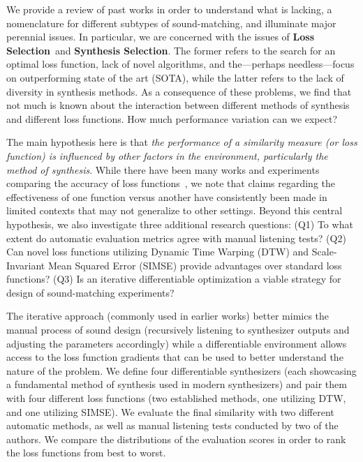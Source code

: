 \documentclass[lettersize,journal]{IEEEtran}
\providecommand{\gls}[1]{#1}
\newcommand{\LossSelect}{\textbf{Loss Selection}}
\newcommand{\SynthSelect}{\textbf{Synthesis Selection}}
\begin{document}
We provide a review of past works in order to understand what is lacking, a nomenclature for different subtypes of sound-matching, and illuminate major perennial issues. In particular, we are concerned with the issues of \LossSelect~and \SynthSelect. The former refers to the search for an optimal loss function, lack of novel algorithms, and the---perhaps needless---focus on outperforming state of the art (\gls{SOTA}), while the latter refers to the lack of diversity in synthesis methods. As a consequence of these problems, we find that not much is known about the interaction between different methods of synthesis and different loss functions. How much performance variation can we expect? 


The main hypothesis here is that \textit{the performance of a similarity measure (or loss function) is influenced by other factors in the environment, particularly the method of synthesis}. While there have been many works and experiments comparing the accuracy of loss functions~\cite{vahidi2023mesostructures,turian2020sorry,engel2020ddsp,uzrad2024diffmoog,han2023perceptual,masuda2021soundmatch,turian2020sorry,bruford2024synthesizer}, we note that claims regarding the effectiveness of one function versus another have consistently been made in limited contexts that may not generalize to other settings. Beyond this central hypothesis, we also investigate three additional research questions: (Q1) To what extent do automatic evaluation metrics agree with manual listening tests? (Q2) Can novel loss functions utilizing Dynamic Time Warping (DTW) and Scale-Invariant Mean Squared Error (SIMSE) provide advantages over standard loss functions? (Q3) Is an iterative differentiable optimization a viable strategy for design of sound-matching experiments?




 The iterative approach (commonly used in earlier works) better mimics the manual process of sound design (recursively listening to synthesizer outputs and adjusting the parameters accordingly) while a differentiable environment allows access to the loss function gradients that can be used to better understand the nature of the problem. We define four differentiable synthesizers (each showcasing a fundamental method of synthesis used in modern synthesizers) and pair them with four different loss functions (two established methods, one utilizing DTW, and one utilizing SIMSE). We evaluate the final similarity with two different automatic methods, as well as manual listening tests conducted by two of the authors. We compare the distributions of the evaluation scores in order to rank the loss functions from best to worst. 
\end{document}
